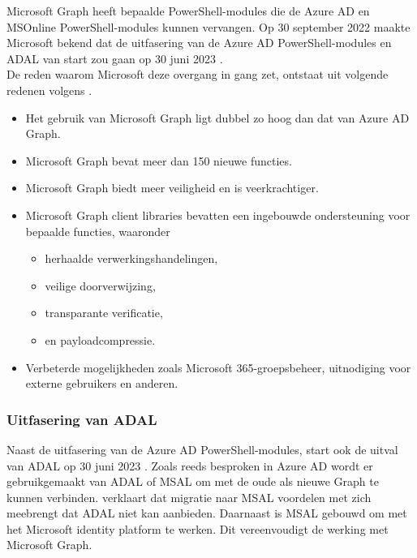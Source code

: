  
Microsoft Graph heeft bepaalde PowerShell-modules die de Azure \ac{AD} en MSOnline PowerShell-modules kunnen vervangen. Op 30 september 2022 maakte Microsoft bekend dat de uitfasering van de Azure \ac{AD} PowerShell-modules en \ac{ADAL} van start zou gaan op 30 juni 2023 \autocite{Sahay2022}. \\

De reden waarom Microsoft deze overgang in gang zet, ontstaat uit volgende redenen volgens \textcite{Microsoft2023e}.

\begin{itemize}
    \item Het gebruik van Microsoft Graph ligt dubbel zo hoog dan dat van Azure \ac{AD} Graph.
    \item Microsoft Graph bevat meer dan 150 nieuwe functies.
    \item Microsoft Graph biedt meer veiligheid en is veerkrachtiger.
    \item Microsoft Graph client libraries bevatten een ingebouwde ondersteuning voor bepaalde functies, waaronder
    \begin{itemize}
        \item herhaalde verwerkingshandelingen,
        \item veilige doorverwijzing,
        \item transparante verificatie,
        \item en payloadcompressie.
    \end{itemize}
    \item Verbeterde mogelijkheden zoals Microsoft 365-groepsbeheer, uitnodiging voor externe gebruikers en anderen.
\end{itemize} 

\subsubsection{Uitfasering van ADAL}


Naast de uitfasering van de Azure \ac{AD} PowerShell-modules, start ook de uitval van \ac{ADAL} op 30 juni 2023 \autocite{Sahay2022}. Zoals reeds besproken in Azure \ac{AD} wordt er gebruikgemaakt van \ac{ADAL} of \ac{MSAL} om met de oude als nieuwe Graph te kunnen verbinden. \textcite{Microsoft2023m} verklaart dat migratie naar \ac{MSAL} voordelen met zich meebrengt dat \ac{ADAL} niet kan aanbieden. Daarnaast is \ac{MSAL} gebouwd om met het Microsoft identity platform te werken. Dit vereenvoudigt de werking met Microsoft Graph.

